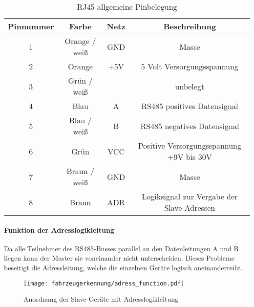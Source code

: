 \begin{table}[h]
    \centering
    \begin{tabular}{|c|c|c|c|}
        \hline
        \textbf{Pinnummer} & \textbf{Farbe} & \textbf{Netz} & \textbf{Beschreibung}                      \\ \hline
        1                  & Orange / weiß  & GND           & Masse                                      \\ \hline
        2                  & Orange         & +5V           & 5 Volt Versorgungsspannung                 \\ \hline
        3                  & Grün / weiß    &               & unbelegt                                   \\ \hline
        4                  & Blau           & A             & RS485 positives Datensignal                \\ \hline
        5                  & Blau / weiß    & B             & RS485 negatives Datensignal                \\ \hline
        6                  & Grün           & VCC           & Positive Versorgungsspannung +9V bis 30V   \\ \hline
        7                  & Braun / weiß   & GND           & Masse                                      \\ \hline
        8                  & Braun          & ADR           & Logiksignal zur Vergabe der Slave Adressen \\ \hline
    \end{tabular}
    \caption{RJ45 allgemeine Pinbelegung}
\end{table}

\paragraph{Funktion der Adresslogikleitung}\label{sec:func_adress_wire}\mbox{}

Da alle Teilnehmer des RS485-Busses parallel an den Datenleitungen A und B liegen kann der Master sie voneinander nicht unterscheiden. Dieses Probleme beseitigt die Adressleitung, welche
die einzelnen Geräte logisch aneinanderreiht.

\begin{figure}[H]
    \centering
    \texttt{[image: fahrzeugerkennung/adress\_function.pdf]}
    \caption{Anordnung der Slave-Geräte mit Adresslogikleitung}
\end{figure}

